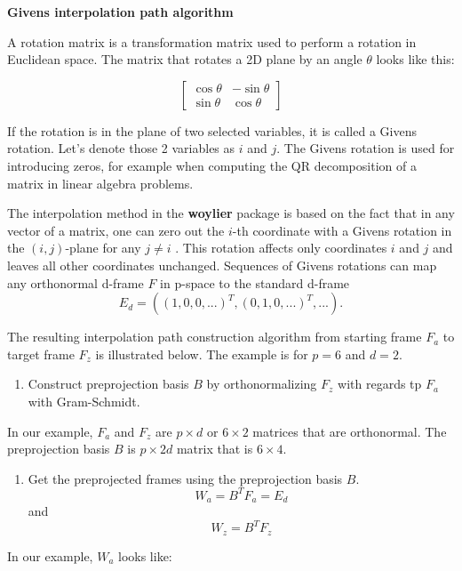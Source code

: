 \textbf{Givens interpolation path algorithm}

A rotation matrix is a transformation matrix used to perform a rotation
in Euclidean space. The matrix that rotates a 2D plane by an angle
\(\theta\) looks like this:

\[ \begin{bmatrix}\cos \theta &-\sin \theta \\\sin \theta &\cos \theta \end{bmatrix} \]

If the rotation is in the plane of two selected variables, it is called
a Givens rotation. Let's denote those 2 variables as \(i\) and \(j\).
The Givens rotation is used for introducing zeros, for example when
computing the QR decomposition of a matrix in linear algebra problems.

The interpolation method in the \textbf{woylier} package is based on the
fact that in any vector of a matrix, one can zero out the \(i\)-th
coordinate with a Givens rotation in the \((i, j)\)-plane for any
\(j\neq i\) \citep{matrix_computation}. This rotation affects only
coordinates \(i\) and \(j\) and leaves all other coordinates unchanged.
Sequences of Givens rotations can map any orthonormal d-frame \(F\) in
p-space to the standard d-frame
\[E_d=((1, 0, 0, ...)^T, (0, 1, 0, ...)^T, ...).\]

The resulting interpolation path construction algorithm from starting
frame \(F_a\) to target frame \(F_z\) is illustrated below. The example
is for \(p=6\) and \(d=2\).

\begin{enumerate}
\def\labelenumi{\arabic{enumi}.}
\tightlist
\item
  Construct preprojection basis \(B\) by orthonormalizing \(F_z\) with
  regards tp \(F_a\) with Gram-Schmidt.
\end{enumerate}

In our example, \(F_a\) and \(F_z\) are \(p\times d\) or \(6\times2\)
matrices that are orthonormal. The preprojection basis \(B\) is
\(p\times 2d\) matrix that is \(6\times 4\).

\begin{enumerate}
\def\labelenumi{\arabic{enumi}.}
\setcounter{enumi}{1}
\tightlist
\item
  Get the preprojected frames using the preprojection basis \(B\).
  \[W_a = B^TF_a = E_d\] and \[W_z = B^TF_z\]
\end{enumerate}

In our example, \(W_a\) looks like:

